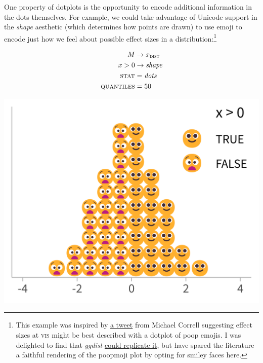 \documentclass[journal]{vgtc}                     %
\begin{document}
One property of dotplots is the opportunity to encode additional information in the dots themselves. For example, we could take advantage of Unicode support in the \textit{shape} aesthetic (which determines how points are drawn) to use emoji to encode just how we feel about possible effect sizes in a distribution:\footnote{This example was inspired by \href{https://twitter.com/Birdbassador/status/916332327696875520}{a tweet} from Michael Correll suggesting effect sizes at \textsc{vis} might be best described with a dotplot of poop emojis. I was delighted to find that \textit{ggdist} \href{https://twitter.com/mjskay/status/1361366253424832512}{could replicate it}, but have spared the literature a faithful rendering of the poopmoji plot by opting for smiley faces here.}


\noindent
\begin{minipage}{.5\columnwidth}

\begin{align*}
M &\rightarrow x_\textsc{dist}\\
x > 0 &\rightarrow \textit{shape}\\
\textsc{stat} &= \mathit{dots}\\
\textsc{quantiles} &= 50
\end{align*}
\end{minipage}%
  \begin{minipage}{.4\columnwidth}
    \centering
    \includegraphics[width=1.2\columnwidth]{figs/3-dots_emoji.png}
  \end{minipage}
\hfill\break
\end{document}
